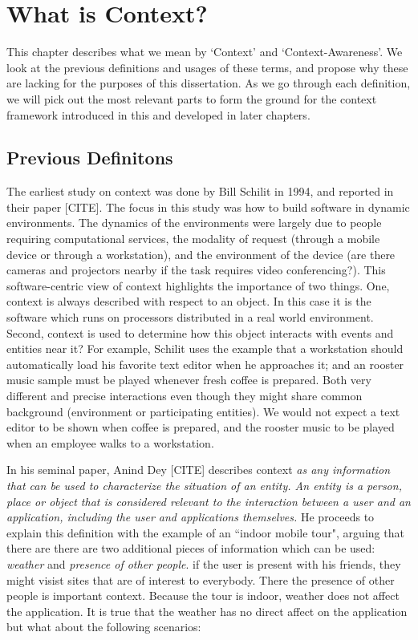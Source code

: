 \chapter{What is Context?}

This chapter describes what we mean by `Context' and `Context-Awareness'. We look at the previous definitions and usages of these terms, and propose why these are lacking for the purposes of this dissertation. As we go through each definition, we will pick out the most relevant parts to form the ground for the context framework introduced in this and developed in later chapters.

\section{Previous Definitons}

The earliest study on context was done by Bill Schilit in 1994, and reported in their paper [CITE]. The focus in this study was how to build software in dynamic environments. The dynamics of the environments were largely due to people requiring computational services, the modality of request (through a mobile device or through a workstation), and the environment of the device (are there cameras and projectors nearby if the task requires video conferencing?). This software-centric view of context highlights the importance of two things. One, context is always described with respect to an object. In this case it is the software which runs on processors distributed in a real world environment. Second, context is used to determine how this object interacts with events and entities near it? For example, Schilit uses the example that a workstation should automatically load his favorite text editor when he approaches it; and an rooster music sample must be played whenever fresh coffee is prepared. Both very different and precise interactions even though they might share common background (environment or participating entities). We would not expect a text editor to be shown when coffee is prepared, and the rooster music to be played when an employee walks to a workstation.

In his seminal paper, Anind Dey [CITE] describes context \textit{as any information that can be used to characterize the situation of an entity. An entity is a person, place or object that is considered relevant to the interaction between a user and an application, including the user and applications themselves.} He proceeds to explain this definition with the example of an ``indoor mobile tour", arguing that there are there are two additional pieces of information which can be used: \textit{weather} and \textit{presence of other people}. if the user is present with his friends, they might visist sites that are of interest to everybody. There the presence of other people is important context. Because the tour is indoor, weather does not affect the application. It is true that the weather has no direct affect on the application but what about the following scenarios:

